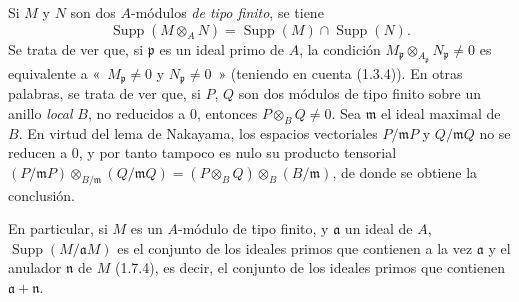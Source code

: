 \begin{env}[1.7.5]
\label{0.1.7.5-fr}
Si $M$ y $N$ son dos $A$-módulos \emph{de tipo finito}, se tiene
\[
  \operatorname{Supp}(M\otimes_A N)
  =\operatorname{Supp}(M)\cap\operatorname{Supp}(N).
\]
Se trata de ver que, si $\mathfrak p$ es un ideal primo de $A$, la
condición $M_{\mathfrak p}\otimes_{A_{\mathfrak p}}N_{\mathfrak p}\neq0$ es
equivalente a «~$M_{\mathfrak p}\neq0$ y $N_{\mathfrak p}\neq0$~» (teniendo
en cuenta (1.3.4)). En otras palabras, se trata de ver que, si $P$, $Q$ son dos
módulos de tipo finito sobre un anillo \emph{local} $B$, no reducidos a $0$, entonces
$P\otimes_B Q\neq0$. Sea $\mathfrak m$ el ideal maximal de $B$. En virtud del
lema de Nakayama, los espacios vectoriales $P/\mathfrak mP$ y
$Q/\mathfrak mQ$ no se reducen a $0$, y por tanto tampoco es nulo su
producto tensorial
$(P/\mathfrak mP)\otimes_{B/\mathfrak m}(Q/\mathfrak mQ)=(P\otimes_B Q)\otimes_B(B/\mathfrak m)$,
de donde se obtiene la conclusión.

En particular, si $M$ es un $A$-módulo de tipo finito, y $\mathfrak a$ un ideal
de $A$, $\operatorname{Supp}(M/\mathfrak aM)$ es el conjunto de los ideales
primos que contienen a la vez $\mathfrak a$ y el anulador $\mathfrak n$ de
$M$ (1.7.4), es decir, el conjunto de los ideales primos que contienen
$\mathfrak a+\mathfrak n$.
\end{env}
